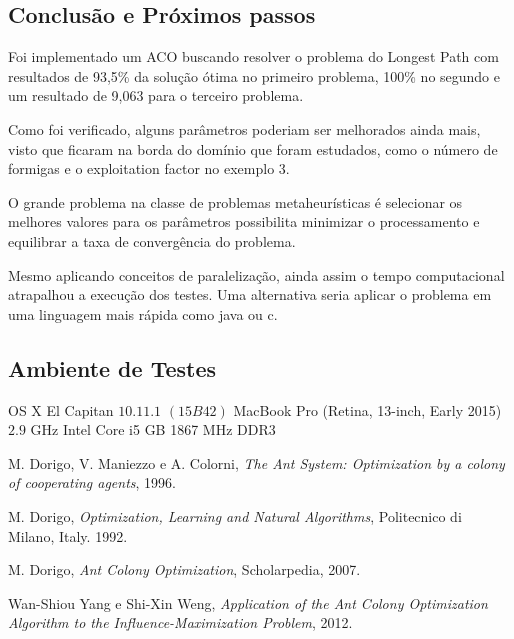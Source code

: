 \documentclass{article}
\begin{document}
 \subsection{Conclusão e Próximos passos}
Foi implementado um ACO buscando resolver o problema do Longest Path com resultados de 93,5\% da solução ótima no primeiro problema, 100\% no segundo e um resultado de 9,063 para o terceiro problema.
\newline
\par

Como foi verificado, alguns parâmetros poderiam ser melhorados ainda mais, visto que ficaram na borda do domínio que foram estudados, como o número de formigas e o exploitation factor no exemplo 3.
\newline
\par
O grande problema na classe de problemas metaheurísticas é selecionar os melhores valores para os parâmetros possibilita minimizar o processamento e equilibrar a taxa de convergência do problema. 
\newline
\par
Mesmo aplicando conceitos de paralelização, ainda assim o tempo computacional atrapalhou a execução dos testes. Uma alternativa seria aplicar o problema em uma linguagem mais rápida como java ou c.
\newline
\par


\subsection {Ambiente de Testes}
\par
OS X El Capitan $10.11.1$ $(15B42)$
\newline
MacBook Pro (Retina, 13-inch, Early 2015)
\newline
$2.9$ GHz Intel Core i5
 GB 1867 MHz DDR3

\clearpage
\begin{thebibliography}{9}
\bibitem{}
  M. Dorigo, V. Maniezzo e A. Colorni,
  \emph{The Ant System: Optimization by a colony of cooperating agents},
  1996.

  \bibitem{}
  M. Dorigo,
  \emph{ Optimization, Learning and Natural Algorithms},
  Politecnico di Milano,
  Italy.
  1992.
  
  \bibitem{}
  M. Dorigo,
  \emph{Ant Colony Optimization},
  Scholarpedia,
  2007.
  
  \bibitem{}
  Wan-Shiou Yang e Shi-Xin Weng,
  \emph{Application of the Ant Colony Optimization Algorithm to the Influence-Maximization Problem},
  2012.
\end{thebibliography}
\end{document}
